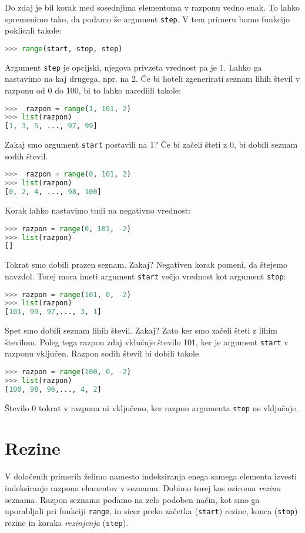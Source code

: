 Do zdaj je bil korak med sosednjima elementoma v razponu vedno enak. To lahko spremenimo tako, da podamo še argument \texttt{step}. V tem primeru bomo funkcijo poklicali takole:
\begin{lstlisting}[language=Python, showstringspaces=false]
>>> range(start, stop, step)
\end{lstlisting}
Argument \texttt{step} je opcijski, njegova privzeta vrednost pa je 1. Lahko ga nastavimo na kaj drugega, npr. na 2. Če bi hoteli zgenerirati seznam lihih števil v razponu od 0 do 100, bi to lahko narediili takole:
\begin{lstlisting}[language=Python, showstringspaces=false]
>>>  razpon = range(1, 101, 2)
>>> list(razpon)
[1, 3, 5, ..., 97, 99]
\end{lstlisting}
Zakaj smo argument \texttt{start} postavili na 1? Če bi začeli šteti z 0, bi dobili seznam sodih števil.
\begin{lstlisting}[language=Python, showstringspaces=false]
>>>  razpon = range(0, 101, 2)
>>> list(razpon)
[0, 2, 4, ..., 98, 100]
\end{lstlisting}
Korak lahko nastavimo tudi na negativno vrednost:
\begin{lstlisting}[language=Python, showstringspaces=false]
>>> razpon = range(0, 101, -2)
>>> list(razpon)
[]
\end{lstlisting}
Tokrat smo dobili prazen seznam. Zakaj? Negativen korak pomeni, da štejemo navzdol. Torej mora imeti argument \texttt{start} večjo vrednost kot argument \texttt{stop}:
\begin{lstlisting}[language=Python, showstringspaces=false]
>>> razpon = range(101, 0, -2)
>>> list(razpon)
[101, 99, 97,..., 3, 1]
\end{lstlisting}
Spet smo dobili seznam lihih števil. Zakaj? Zato ker smo začeli šteti z lihim številom. Poleg tega razpon zdaj vklučuje število 101, ker je argument \texttt{start} v razponu vključen. Razpon sodih števil bi dobili takole
\begin{lstlisting}[language=Python, showstringspaces=false]
>>> razpon = range(100, 0, -2)
>>> list(razpon)
[100, 98, 96,..., 4, 2]
\end{lstlisting}
Število 0 tokrat v razponu ni vključeno, ker razpon argumenta \texttt{stop} ne vključuje. 

\section{Rezine}

V določenih primerih želimo namesto indeksiranja enega samega elementa izvesti indeksiranje razpona elementov v seznamu. Dobimo torej kos oziroma \emph{rezino}  seznama. Razpon seznama podamo na zelo podoben način, kot smo ga uporabljali pri funkciji \texttt{range}, in sicer preko začetka (\texttt{start}) rezine, konca (\texttt{stop}) rezine in koraka \emph{rezinjenja} (\texttt{step}).

